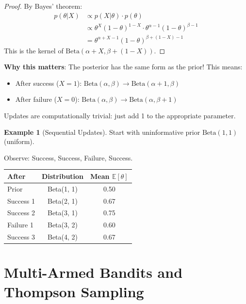 \documentclass[11pt,a4paper]{article}
\theoremstyle{definition}
\newtheorem{example}{Example}[section]
\theoremstyle{plain}
\newcommand{\E}{\mathbb{E}}
\begin{document}
\begin{proof}
By Bayes' theorem:
\begin{align}
p(\theta | X) &\propto p(X | \theta) \cdot p(\theta) \\
&\propto \theta^X (1-\theta)^{1-X} \cdot \theta^{\alpha-1}(1-\theta)^{\beta-1} \\
&= \theta^{\alpha + X - 1} (1-\theta)^{\beta + (1-X) - 1}
\end{align}
This is the kernel of $\text{Beta}(\alpha + X, \beta + (1-X))$.
\end{proof}

\begin{keypoint}
\textbf{Why this matters}: The posterior has the same form as the prior! This means:
\begin{itemize}
    \item After success ($X=1$): $\text{Beta}(\alpha, \beta) \to \text{Beta}(\alpha+1, \beta)$
    \item After failure ($X=0$): $\text{Beta}(\alpha, \beta) \to \text{Beta}(\alpha, \beta+1)$
\end{itemize}
Updates are computationally trivial: just add 1 to the appropriate parameter.
\end{keypoint}

\begin{example}[Sequential Updates]
Start with uninformative prior $\text{Beta}(1, 1)$ (uniform).

Observe: Success, Success, Failure, Success.

\begin{center}
\begin{tabular}{lcc}
\toprule
After & Distribution & Mean $\E[\theta]$ \\
\midrule
Prior & Beta(1, 1) & 0.50 \\
Success 1 & Beta(2, 1) & 0.67 \\
Success 2 & Beta(3, 1) & 0.75 \\
Failure 1 & Beta(3, 2) & 0.60 \\
Success 3 & Beta(4, 2) & 0.67 \\
\bottomrule
\end{tabular}
\end{center}
\end{example}

\newpage
\section{Multi-Armed Bandits and Thompson Sampling}
\end{document}
